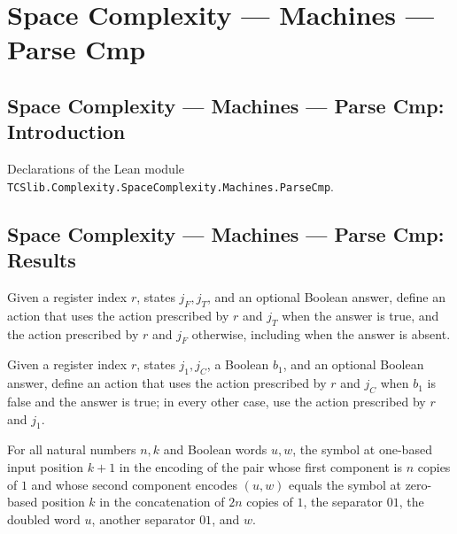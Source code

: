\section{Space Complexity --- Machines --- Parse Cmp}
\subsection*{Space Complexity --- Machines --- Parse Cmp: Introduction}

Declarations of the Lean module \texttt{TCSlib.Complexity.SpaceComplexity.Machines.ParseCmp}.

\subsection*{Space Complexity --- Machines --- Parse Cmp: Results}

\begin{definition}
\label{Complexity.LogProg.pskip1Act}
\leanok
{}
Given a register index $r$, states $j_F,j_T$, and an optional Boolean answer, define an
action that uses the action prescribed by $r$ and $j_T$ when the answer is true, and the
action prescribed by $r$ and $j_F$ otherwise, including when the answer is absent.
\end{definition}

\begin{definition}
\label{Complexity.LogProg.pskip2Act}
\leanok
{}
Given a register index $r$, states $j_1,j_C$, a Boolean $b_1$, and an optional Boolean
answer, define an action that uses the action prescribed by $r$ and $j_C$ when $b_1$ is
false and the answer is true; in every other case, use the action prescribed by $r$ and
$j_1$.
\end{definition}

\begin{lemma}
\label{Complexity.LogProg.inSym_pairInput}
\leanok
{}
For all natural numbers $n,k$ and Boolean words $u,w$, the symbol at one-based input
position $k+1$ in the encoding of the pair whose first component is $n$ copies of $1$
and whose second component encodes $(u,w)$ equals the symbol at zero-based position $k$
in the concatenation of $2n$ copies of $1$, the separator $01$, the doubled word $u$,
another separator $01$, and $w$.
\end{lemma}

